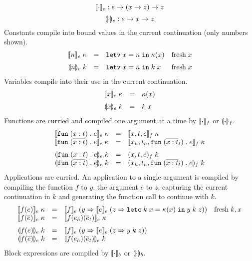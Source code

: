 \documentclass[11pt]{article}
\begin{document}
\[
    \llbracket \cdot \rrbracket_e : e -> (x -> z) -> z
\]
\[
    \llparenthesis \cdot \rrparenthesis_e : e -> x -> z
\]
Constants compile into bound values in the current continuation (only numbers shown).
\[
\begin{array}{rcll}
\cmpk{e}{\nume{n}} & = &
  \letv{x}{n}{\kappa(x)}   & \fresh{x} \medskip \\

\tcmpk{e}{\nume{n}} & = &
  \letv{x}{n}{\appc{k}{x}} & \fresh{x} \\
\end{array}
\]
Variables compile into their use in the current continuation.
\[
\begin{array}{rcll}
\cmpk{e}{\vare{x}} & = &
  \kappa(x) \medskip \\

\tcmpk{e}{\vare{x}} & = &
  \appc{k}{x} \\
\end{array}
\]
Functions are curried and compiled one argument at a time by $\llbracket \cdot \rrbracket_f$ or $\llparenthesis \cdot \rrparenthesis_f$.
\[
\begin{array}{rcll}
\cmpk{e}{\fune{\arge{x}{t}}{e}} & = &
  \cmpk{f}{x,t,e}
  \\
\cmpk{e}{\fune{\repo{\arge{x}{t}}}{e}} & = &
  \cmpk{f}{x_h,t_h,\fune{\repo{\arge{x}{t}}_t}{e}} \medskip \\

\tcmpk{e}{\fune{\arge{x}{t}}{e}} & = &
  \tcmpk{f}{x,t,e}
  \\
\tcmpk{e}{\fune{\repo{\arge{x}{t}}}{e}} & = &
  \tcmpk{f}{x_h,t_h,\fune{\repo{\arge{x}{t}}_t}{e}}
\end{array}
\]
Applications are curried.
An application to a single argument is compiled by compiling the function $f$ to $y$, the argument $e$ to $z$, capturing the current continuation in $k$ and generating the function call to continue with $k$.
\[
\begin{array}{rcll}
\cmpk{e}{\appe{f}{e}} & = &
  \cmpin{e}{f}{(y => \cmpin{e}{e}{(z => \letc{k}{x}{\kappa(x)}{\appf{y}{k}{z}})})} &
  \fresh{k,x} \\
\cmpk{e}{\appe{f}{\repo{e}}} & = &
  \cmpk{e}{\appe{\appe{f}{e_h}}{\repo{e}_t}} \medskip \\

\tcmpk{e}{\appe{f}{e}} & = &
  \cmpin{e}{f}{(y => \cmpin{e}{e}{(z => \appf{y}{k}{z})})} \\
\tcmpk{e}{\appe{f}{\repo{e}}} & = &
  \tcmpk{e}{\appe{\appe{f}{e_h}}{\repo{e}_t}} \\
\end{array}
\]
Block expressions are compiled by $\llbracket \cdot \rrbracket_b$ or $\llparenthesis \cdot \rrparenthesis_b$.
\end{document}
